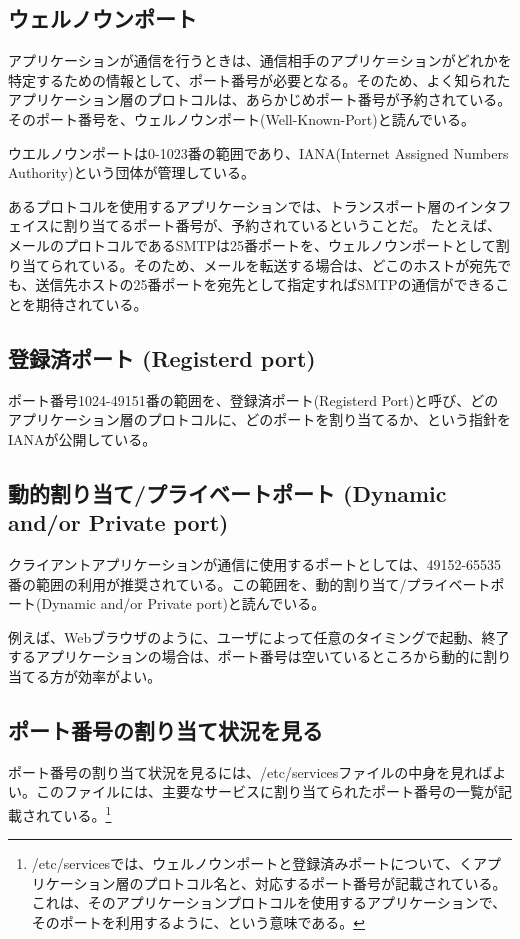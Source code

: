 \subsection{ウェルノウンポート}
アプリケーションが通信を行うときは、通信相手のアプリケ＝ションがどれかを特定するための情報として、ポート番号が必要となる。そのため、よく知られたアプリケーション層のプロトコルは、あらかじめポート番号が予約されている。そのポート番号を、ウェルノウンポート(Well-Known-Port)と読んでいる。

ウエルノウンポートは0-1023番の範囲であり、IANA(Internet Assigned Numbers Authority)という団体が管理している。

あるプロトコルを使用するアプリケーションでは、トランスポート層のインタフェイスに割り当てるポート番号が、予約されているということだ。
たとえば、メールのプロトコルであるSMTPは25番ポートを、ウェルノウンポートとして割り当てられている。そのため、メールを転送する場合は、どこのホストが宛先でも、送信先ホストの25番ポートを宛先として指定すればSMTPの通信ができることを期待されている。


\subsection{登録済ポート (Registerd port)}

ポート番号1024-49151番の範囲を、登録済ポート(Registerd Port)と呼び、どのアプリケーション層のプロトコルに、どのポートを割り当てるか、という指針をIANAが公開している。

\subsection{動的割り当て/プライベートポート (Dynamic and/or Private port)}

クライアントアプリケーションが通信に使用するポートとしては、49152-65535番の範囲の利用が推奨されている。この範囲を、動的割り当て/プライベートポート(Dynamic and/or Private port)と読んでいる。

例えば、Webブラウザのように、ユーザによって任意のタイミングで起動、終了するアプリケーションの場合は、ポート番号は空いているところから動的に割り当てる方が効率がよい。

\subsection{ポート番号の割り当て状況を見る}

ポート番号の割り当て状況を見るには、/etc/servicesファイルの中身を見ればよい。このファイルには、主要なサービスに割り当てられたポート番号の一覧が記載されている。\footnote{/etc/servicesでは、ウェルノウンポートと登録済みポートについて、くアプリケーション層のプロトコル名と、対応するポート番号が記載されている。これは、そのアプリケーションプロトコルを使用するアプリケーションで、そのポートを利用するように、という意味である。}

